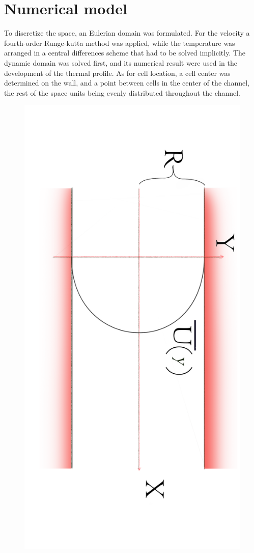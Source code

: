 \documentclass[10pt]{article} %
\begin{document}
\section{Numerical model}


To discretize the space, an Eulerian domain was formulated. For the velocity a fourth-order Runge-kutta method was applied, while the temperature was arranged in a central differences scheme that had to be solved implicitly. The dynamic domain was solved first, and its numerical result were used in the development of the thermal profile. As for cell location, a cell center was determined on the wall, and a point between cells in the center of the channel, the rest of the space units being evenly distributed throughout the channel.
\begin{figure}[!h]
	\centering
	\includegraphics[angle=90, scale=0.06]{canalvermelho}

\end{figure}
\end{document}
